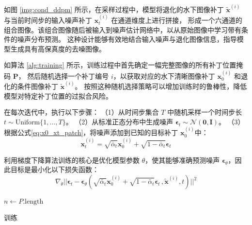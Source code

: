 如图 \ref{img:cond_ddpm} 所示，在采样过程中，模型将退化的水下图像补丁 $\tilde{\mathbf{x}}^{(i)}$ 与当前时间步的输入噪声补丁 $\mathbf{x}^{(i)}_t$ 在通道维度上进行拼接，
形成一个六通道的组合图像。该组合图像随后被输入到噪声估计网络中，以从原始图像中学习带有条件的噪声分布预测。
这种设计能够有效地结合输入噪声与退化图像信息，指导模型生成具有高保真度的去噪图像。

如算法 \ref{alg:training} 所示，训练过程中首先确定一幅完整图像的所有补丁位置掩码 $\bm{P}$，
然后随机选择一个补丁编号 $i$，以获取对应的水下清晰图像补丁 $\mathbf{x}_0^{(i)}$ 和退化的条件图像补丁 $\tilde{\mathbf{x}}^{(i)}$。
按照这种随机选择策略可以增加训练时的鲁棒性，降低模型对特定补丁位置的过拟合风险。

在每次迭代中，执行以下步骤：
（1）从时间步集合 $T$ 中随机采样一个时间步长$t \sim \text{Uniform}\{1,\ldots,T\}$。
（2）从标准正态分布中生成噪声 $\bm{\epsilon}_t \sim \mathcal{N}(\mathbf{0}, \mathbf{I})$。
（3）根据公式\eqref{eq:x0_xt_patch}，将噪声添加到已知的目标补丁 $\mathbf{x}_0^{(i)}$中：
\begin{equation}
\label{eq:x0_xt_patch}
    \mathbf{x}_t^{(i)} = \sqrt{\bar{\alpha}_t} \mathbf{x}_0^{(i)} + \sqrt{1 - \bar{\alpha}_t} \bm{\epsilon}_t
\end{equation}

利用梯度下降算法训练的核心是优化模型参数 $\theta$，使其能够准确预测噪声 $\bm{\epsilon}_\theta$，因此目标是最小化以下损失函数：
\begin{equation}
    \nabla_{\theta}\vert\vert\bm{\epsilon}_t -  \bm{\epsilon}_{\theta}(\sqrt{\bar{\alpha}_t}\mathbf{x}_0^{(i)}+\sqrt{1-\bar{\alpha}_t}\bm{\epsilon}_t\,,\tilde{\mathbf{x}}^{(i)},t)\vert\vert^2
\end{equation}

\begin{algorithm}
    \SetAlgoLined
  
    $n \leftarrow P.\text{length}$\;
    \caption{训练}
    \label{alg:training}
  \end{algorithm}

